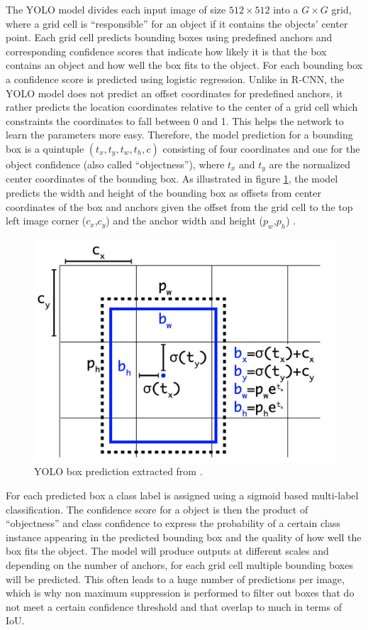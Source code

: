 The \ac{YOLO} model divides each input image of size $512\times512$ into a $G\times G$ grid, where a grid cell is \enquote{responsible} for an object if it contains the objects' center point. Each grid cell predicts bounding boxes using predefined anchors and corresponding confidence scores that indicate how likely it is that the box contains an object and how well the box fits to the object. For each bounding box a confidence score is predicted using logistic regression. Unlike in \ac{R-CNN}, the \ac{YOLO} model does not predict an offset coordinates for predefined anchors, it rather predicts the location coordinates relative to the center of a grid cell which constraints the coordinates to fall between 0 and 1. This helps the network to learn the parameters more easy. Therefore, the model prediction for a bounding box is a quintuple $(t_x,t_y,t_w,t_h,c)$ consisting of four coordinates and one for the object confidence (also called \enquote{objectness}), where $t_x$ and $t_y$ are the normalized center coordinates of the bounding box. As illustrated in figure \ref{fig:yolo_box}, the model predicts the width and height of the bounding box as offsets from center coordinates of the box and anchors given the offset from the grid cell to the top left image corner ($c_x$,$c_y$) and the anchor width and height ($p_w$,$p_h$) \autocite{yolov2} \autocite{yolov3}.
\begin{figure}[h!]
	\centering
	\includegraphics[width=.45\linewidth]{img/boxpred.png}
	\caption{\ac{YOLO} box prediction extracted from \autocite{yolov3}.}
	\label{fig:yolo_box}
\end{figure}
For each predicted box a class label is assigned using a sigmoid based multi-label classification. The confidence score for a object is then the product of \enquote{objectness} and class confidence to express the probability of a certain class instance appearing in the predicted bounding box and the quality of how well the box fits the object.
The model will produce outputs at different scales and depending on the number of anchors, for each grid cell multiple bounding boxes will be predicted. This often leads to a huge number of predictions per image, which is why non maximum suppression is performed  to filter out boxes that do not meet a certain confidence threshold and that overlap to much in terms of \ac{IoU}.


